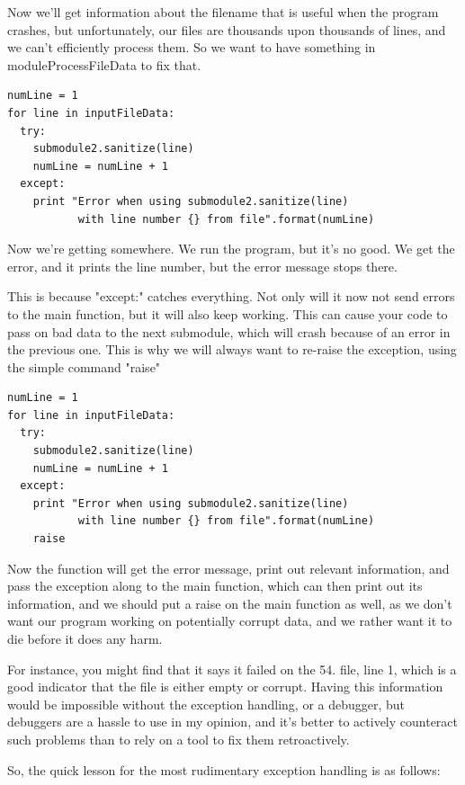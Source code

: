 \documentclass[10pt,a4paper]{article}
\begin{document}
Now we'll get information about the filename that is useful when the program crashes, but unfortunately, our files are thousands upon thousands of lines, and we can't efficiently process them. So we want to have something in moduleProcessFileData to fix that.

\begin{lstlisting}
numLine = 1
for line in inputFileData:
  try: 
    submodule2.sanitize(line)
    numLine = numLine + 1
  except:
    print "Error when using submodule2.sanitize(line) 
           with line number {} from file".format(numLine)

\end{lstlisting}

Now we're getting somewhere. We run the program, but it's no good. We get the error, and it prints the line number, but the error message stops there.

This is because "except:" catches everything. Not only will it now not send errors to the main function, but it will also keep working. This can cause your code to pass on bad data to the next submodule, which will crash because of an error in the previous one. This is why we will always want to re-raise the exception, using the simple command "raise"


\begin{lstlisting}
numLine = 1
for line in inputFileData:
  try: 
    submodule2.sanitize(line)
    numLine = numLine + 1
  except:
    print "Error when using submodule2.sanitize(line) 
           with line number {} from file".format(numLine)
    raise

\end{lstlisting}

Now the function will get the error message, print out relevant information, and pass the exception along to the main function, which can then print out its information, and we should put a raise on the main function as well, as we don't want our program working on potentially corrupt data, and we rather want it to die before it does any harm. 

For instance, you might find that it says it failed on the 54. file, line 1, which is a good indicator that the file is either empty or corrupt. Having this information would be impossible without the exception handling, or a debugger, but debuggers are a hassle to use in my opinion, and it's better to actively counteract such problems than to rely on a tool to fix them retroactively. 

So, the quick lesson for the most rudimentary exception handling is as follows:
\end{document}
